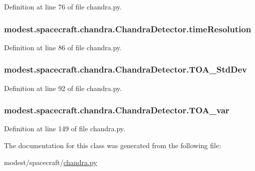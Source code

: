 Definition at line 76 of file chandra.\+py.

\subsubsection[{\texorpdfstring{time\+Resolution}{timeResolution}}]{\setlength{\rightskip}{0pt plus 5cm}modest.\+spacecraft.\+chandra.\+Chandra\+Detector.\+time\+Resolution}\hypertarget{classmodest_1_1spacecraft_1_1chandra_1_1ChandraDetector_a1a8e3064bd35d00d792fe476a972233f}{}\label{classmodest_1_1spacecraft_1_1chandra_1_1ChandraDetector_a1a8e3064bd35d00d792fe476a972233f}


Definition at line 86 of file chandra.\+py.

\subsubsection[{\texorpdfstring{T\+O\+A\+\_\+\+Std\+Dev}{TOA_StdDev}}]{\setlength{\rightskip}{0pt plus 5cm}modest.\+spacecraft.\+chandra.\+Chandra\+Detector.\+T\+O\+A\+\_\+\+Std\+Dev}\hypertarget{classmodest_1_1spacecraft_1_1chandra_1_1ChandraDetector_a5bc5ab1fcbd46cd16b152aa3820de840}{}\label{classmodest_1_1spacecraft_1_1chandra_1_1ChandraDetector_a5bc5ab1fcbd46cd16b152aa3820de840}


Definition at line 92 of file chandra.\+py.

\subsubsection[{\texorpdfstring{T\+O\+A\+\_\+var}{TOA_var}}]{\setlength{\rightskip}{0pt plus 5cm}modest.\+spacecraft.\+chandra.\+Chandra\+Detector.\+T\+O\+A\+\_\+var}\hypertarget{classmodest_1_1spacecraft_1_1chandra_1_1ChandraDetector_a45e346c0f4de1208fd405e8735bb4135}{}\label{classmodest_1_1spacecraft_1_1chandra_1_1ChandraDetector_a45e346c0f4de1208fd405e8735bb4135}


Definition at line 149 of file chandra.\+py.



The documentation for this class was generated from the following file\+:\begin{DoxyCompactItemize}
\item 
modest/spacecraft/\hyperlink{chandra_8py}{chandra.\+py}\end{DoxyCompactItemize}
